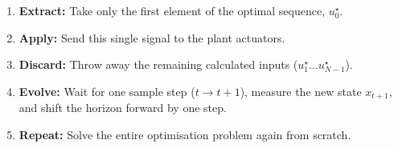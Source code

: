 \begin{enumerate}
	\item \textbf{Extract:} Take only the first element of the optimal sequence, $u^\star_{0}$.
	\item \textbf{Apply:} Send this single signal to the plant actuators.
	\item \textbf{Discard:} Throw away the remaining calculated inputs ($u^\star_{1} \dots u^\star_{N-1}$).
	\item \textbf{Evolve:} Wait for one sample step ($t \to t+1$), measure the new state $x_{t+1}$, and shift the horizon forward by one step.
	\item \textbf{Repeat:} Solve the entire optimisation problem again from scratch.
\end{enumerate}




